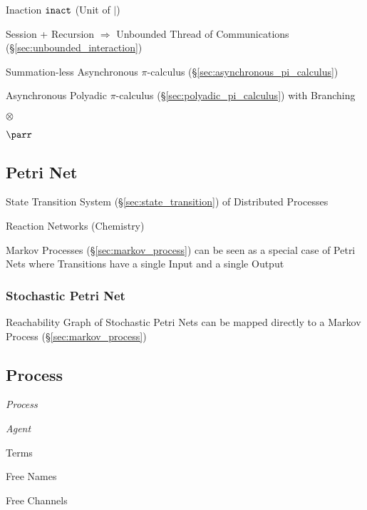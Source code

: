 Inaction $\mathtt{inact}$ (Unit of $|$)


Session + Recursion $\Rightarrow$ Unbounded Thread of Communications
(\S\ref{sec:unbounded_interaction}) \cite{honda-vasconcelos-kubo98}

Summation-less Asynchronous $\pi$-calculus
(\S\ref{sec:asynchronous_pi_calculus}) \cite{honda-vasconcelos-kubo98}

Asynchronous Polyadic $\pi$-calculus
(\S\ref{sec:polyadic_pi_calculus}) with Branching
\cite{honda-vasconcelos-kubo98}


$\otimes$

$\parr$



\subsection{Petri Net}\label{sec:petri_net}

State Transition System (\S\ref{sec:state_transition}) of Distributed
Processes

Reaction Networks (Chemistry)

Markov Processes (\S\ref{sec:markov_process}) can be seen as a special
case of Petri Nets where Transitions have a single Input and a single
Output



\subsubsection{Stochastic Petri Net}\label{sec:stochastic_petri_net}

Reachability Graph of Stochastic Petri Nets can be mapped directly to
a Markov Process (\S\ref{sec:markov_process})



\subsection{Process}\label{sec:process}

\emph{Process}

\emph{Agent}

Terms

Free Names

Free Channels

